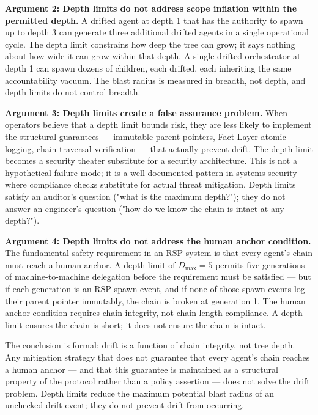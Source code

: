 \bigskip
\noindent\textbf{Argument 2: Depth limits do not address scope inflation within the permitted depth.} A drifted agent at depth 1 that has the authority to spawn up to depth 3 can generate three additional drifted agents in a single operational cycle. The depth limit constrains how deep the tree can grow; it says nothing about how wide it can grow within that depth. A single drifted orchestrator at depth 1 can spawn dozens of children, each drifted, each inheriting the same accountability vacuum. The blast radius is measured in breadth, not depth, and depth limits do not control breadth.

\bigskip
\noindent\textbf{Argument 3: Depth limits create a false assurance problem.} When operators believe that a depth limit bounds risk, they are less likely to implement the structural guarantees — immutable parent pointers, Fact Layer atomic logging, chain traversal verification — that actually prevent drift. The depth limit becomes a security theater substitute for a security architecture. This is not a hypothetical failure mode; it is a well-documented pattern in systems security where compliance checks substitute for actual threat mitigation. Depth limits satisfy an auditor's question ("what is the maximum depth?"); they do not answer an engineer's question ("how do we know the chain is intact at any depth?").

\bigskip
\noindent\textbf{Argument 4: Depth limits do not address the human anchor condition.} The fundamental safety requirement in an RSP system is that every agent's chain must reach a human anchor. A depth limit of $D_{\max}=5$ permits five generations of machine-to-machine delegation before the requirement must be satisfied — but if each generation is an RSP spawn event, and if none of those spawn events log their parent pointer immutably, the chain is broken at generation 1. The human anchor condition requires chain integrity, not chain length compliance. A depth limit ensures the chain is short; it does not ensure the chain is intact.

\bigskip
The conclusion is formal: drift is a function of chain integrity, not tree depth. Any mitigation strategy that does not guarantee that every agent's chain reaches a human anchor — and that this guarantee is maintained as a structural property of the protocol rather than a policy assertion — does not solve the drift problem. Depth limits reduce the maximum potential blast radius of an unchecked drift event; they do not prevent drift from occurring.

